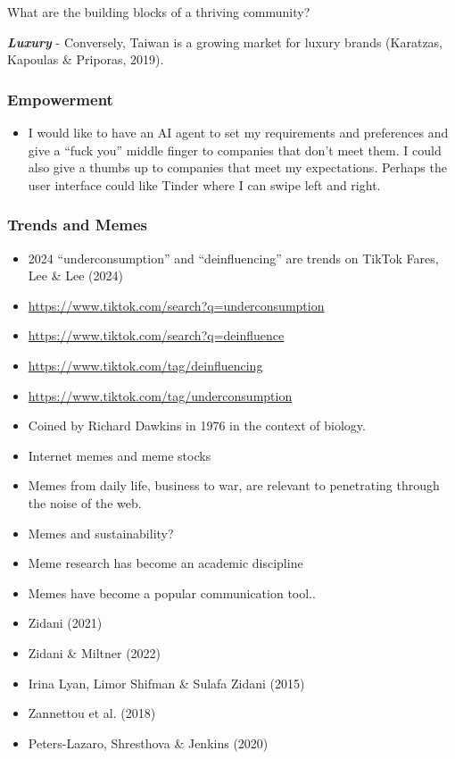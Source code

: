 \documentclass[
  letterpaper,
  DIV=11,
  numbers=noendperiod]{scrartcl}
\providecommand{\tightlist}{%
  \setlength{\itemsep}{0pt}\setlength{\parskip}{0pt}}\usepackage{longtable,booktabs,array}
\begin{document}
What are the building blocks of a thriving community?

\textbf{\emph{Luxury}} - Conversely, Taiwan is a growing market for
luxury brands (Karatzas, Kapoulas \& Priporas, 2019).

\subsubsection{Empowerment}\label{empowerment}

\begin{itemize}
\tightlist
\item
  I would like to have an AI agent to set my requirements and
  preferences and give a ``fuck you'' middle finger to companies that
  don't meet them. I could also give a thumbs up to companies that meet
  my expectations. Perhaps the user interface could like Tinder where I
  can swipe left and right.
\end{itemize}

\subsubsection{Trends and Memes}\label{trends-and-memes}

\begin{itemize}
\item
  2024 ``underconsumption'' and ``deinfluencing'' are trends on TikTok
  Fares, Lee \& Lee (2024)
\item
  \url{https://www.tiktok.com/search?q=underconsumption}
\item
  \url{https://www.tiktok.com/search?q=deinfluence}
\item
  \url{https://www.tiktok.com/tag/deinfluencing}
\item
  \url{https://www.tiktok.com/tag/underconsumption}
\item
  Coined by Richard Dawkins in 1976 in the context of biology.
\item
  Internet memes and meme stocks
\item
  Memes from daily life, business to war, are relevant to penetrating
  through the noise of the web.
\item
  Memes and sustainability?
\item
  Meme research has become an academic discipline
\item
  Memes have become a popular communication tool..
\item
  Zidani (2021)
\item
  Zidani \& Miltner (2022)
\item
  Irina Lyan, Limor Shifman \& Sulafa Zidani (2015)
\item
  Zannettou et al. (2018)
\item
  Peters-Lazaro, Shresthova \& Jenkins (2020)
\end{itemize}
\end{document}
